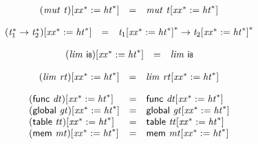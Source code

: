 $$
\begin{array}{@{}lcl@{}l@{}}
{({\mathit{mut}}~{\mathit{t}})}{[{{\mathit{xx}}^\ast} := {{\mathit{ht}}^\ast}]} &=& {\mathit{mut}}~{{\mathit{t}}}{[{{\mathit{xx}}^\ast} := {{\mathit{ht}}^\ast}]} &  \\
\end{array}
$$

$$
\begin{array}{@{}lcl@{}l@{}}
{({{\mathit{t}}_{{1}}^\ast} \rightarrow {{\mathit{t}}_{{2}}^\ast})}{[{{\mathit{xx}}^\ast} := {{\mathit{ht}}^\ast}]} &=& {{{\mathit{t}}_{{1}}}{[{{\mathit{xx}}^\ast} := {{\mathit{ht}}^\ast}]}^\ast} \rightarrow {{{\mathit{t}}_{{2}}}{[{{\mathit{xx}}^\ast} := {{\mathit{ht}}^\ast}]}^\ast} &  \\
\end{array}
$$

$$
\begin{array}{@{}lcl@{}l@{}}
{({\mathit{lim}}~\mathsf{i{\scriptstyle8}})}{[{{\mathit{xx}}^\ast} := {{\mathit{ht}}^\ast}]} &=& {\mathit{lim}}~\mathsf{i{\scriptstyle8}} &  \\
\end{array}
$$

$$
\begin{array}{@{}lcl@{}l@{}}
{({\mathit{lim}}~{\mathit{rt}})}{[{{\mathit{xx}}^\ast} := {{\mathit{ht}}^\ast}]} &=& {\mathit{lim}}~{{\mathit{rt}}}{[{{\mathit{xx}}^\ast} := {{\mathit{ht}}^\ast}]} &  \\
\end{array}
$$

$$
\begin{array}{@{}lcl@{}l@{}}
{(\mathsf{func}~{\mathit{dt}})}{[{{\mathit{xx}}^\ast} := {{\mathit{ht}}^\ast}]} &=& \mathsf{func}~{{\mathit{dt}}}{[{{\mathit{xx}}^\ast} := {{\mathit{ht}}^\ast}]} &  \\
{(\mathsf{global}~{\mathit{gt}})}{[{{\mathit{xx}}^\ast} := {{\mathit{ht}}^\ast}]} &=& \mathsf{global}~{{\mathit{gt}}}{[{{\mathit{xx}}^\ast} := {{\mathit{ht}}^\ast}]} &  \\
{(\mathsf{table}~{\mathit{tt}})}{[{{\mathit{xx}}^\ast} := {{\mathit{ht}}^\ast}]} &=& \mathsf{table}~{{\mathit{tt}}}{[{{\mathit{xx}}^\ast} := {{\mathit{ht}}^\ast}]} &  \\
{(\mathsf{mem}~{\mathit{mt}})}{[{{\mathit{xx}}^\ast} := {{\mathit{ht}}^\ast}]} &=& \mathsf{mem}~{{\mathit{mt}}}{[{{\mathit{xx}}^\ast} := {{\mathit{ht}}^\ast}]} &  \\
\end{array}
$$


